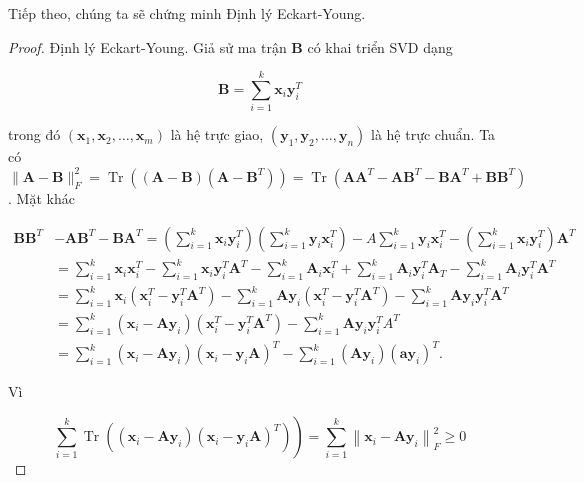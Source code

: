 \documentclass[12pt,a4paper,oneside]{report}
\numberwithin{equation}{section}
\begin{document}
Tiếp theo, chúng ta sẽ chứng minh Định lý Eckart-Young.
\begin{proof}
Định lý Eckart-Young. Giả sử ma trận $\mathbf{B}$ có khai triển SVD dạng

$$
\mathbf{B}=\sum_{i=1}^{k} \mathbf{x}_{i} \mathbf{y}_{i}^{T}
$$

trong đó $\left(\mathbf{x}_{1}, \mathbf{x}_{2}, \ldots, \mathbf{x}_{m}\right)$ là hệ trực giao, $\left(\mathbf{y}_{1}, \mathbf{y}_{2}, \ldots, \mathbf{y}_{n}\right)$ là hệ trực chuẩn. Ta có $\|\mathbf{A}-\mathbf{B}\|_{F}^{2}=\operatorname{Tr}\left((\mathbf{A}-\mathbf{B})\left(\mathbf{A}-\mathbf{B}^{T}\right)\right)=\operatorname{Tr}\left(\mathbf{A} \mathbf{A}^{T}-\mathbf{A} \mathbf{B}^{T}-\mathbf{B A}^{T}+\mathbf{B B}^{T}\right)$. Mặt khác

$$
\begin{aligned}
	\mathbf{B} \mathbf{B}^{T} & -\mathbf{A B}^{T}-\mathbf{B} \mathbf{A}^{T}=\left(\sum_{i=1}^{k} \mathbf{x}_{i} \mathbf{y}_{i}^{T}\right)\left(\sum_{i=1}^{k} \mathbf{y}_{i} \mathbf{x}_{i}^{T}\right)-A \sum_{i=1}^{k} \mathbf{y}_{i} \mathbf{x}_{i}^{T}-\left(\sum_{i=1}^{k} \mathbf{x}_{i} \mathbf{y}_{i}^{T}\right) \mathbf{A}^{T} \\
	& =\sum_{i=1}^{k} \mathbf{x}_{i} \mathbf{x}_{i}^{T}-\sum_{i=1}^{k} \mathbf{x}_{i} \mathbf{y}_{i}^{T} \mathbf{A}^{T}-\sum_{i=1}^{k} \mathbf{A}_{i} \mathbf{x}_{i}^{T}+\sum_{i=1}^{k} \mathbf{A}_{i} \mathbf{y}_{i}^{T} \mathbf{A}_{T}-\sum_{i=1}^{k} \mathbf{A}_{i} \mathbf{y}_{i}^{T} \mathbf{A}^{T} \\
	& =\sum_{i=1}^{k} \mathbf{x}_{i}\left(\mathbf{x}_{i}^{T}-\mathbf{y}_{i}^{T} \mathbf{A}^{T}\right)-\sum_{i=1}^{k} \mathbf{A} \mathbf{y}_{i}\left(\mathbf{x}_{i}^{T}-\mathbf{y}_{i}^{T} \mathbf{A}^{T}\right)-\sum_{i=1}^{k} \mathbf{A} \mathbf{y}_{i} \mathbf{y}_{i}^{T} \mathbf{A}^{T} \\
	& =\sum_{i=1}^{k}\left(\mathbf{x}_{i}-\mathbf{A} \mathbf{y}_{i}\right)\left(\mathbf{x}_{i}^{T}-\mathbf{y}_{i}^{T} \mathbf{A}^{T}\right)-\sum_{i=1}^{k} \mathbf{A} \mathbf{y}_{i} \mathbf{y}_{i}^{T} A^{T} \\
	& =\sum_{i=1}^{k}\left(\mathbf{x}_{i}-\mathbf{A} \mathbf{y}_{i}\right)\left(\mathbf{x}_{i}-\mathbf{y}_{i} \mathbf{A}\right)^{T}-\sum_{i=1}^{k}\left(\mathbf{A y}_{i}\right)\left(\mathbf{a y}_{i}\right)^{T} .
\end{aligned}
$$

Vì

$$
\left.\sum_{i=1}^{k} \operatorname{Tr}\left(\left(\mathbf{x}_{i}-\mathbf{A y}_{i}\right)\left(\mathbf{x}_{i}-\mathbf{y}_{i} \mathbf{A}\right)^{T}\right)\right)=\sum_{i=1}^{k}\left\|\mathbf{x}_{i}-\mathbf{A y}_{i}\right\|_{F}^{2} \geqslant 0
$$


\end{proof}
\end{document}
